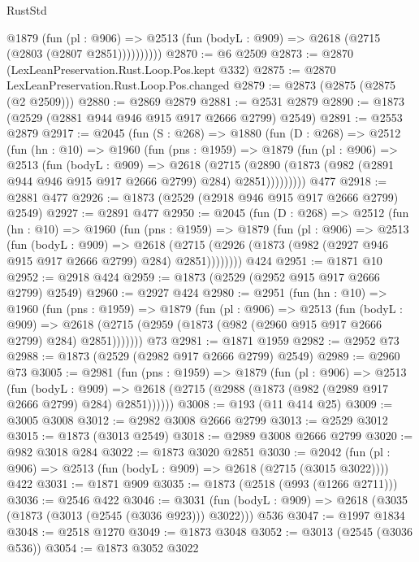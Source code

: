 \begin{lexlean}{RustStd}
\begin{coremodule}
            @1879
              (fun (pl : @906) =>
              @2513 (fun (bodyL : @909) => @2618 (@2715 (@2803 (@2807 @2851))))))))))
@2870 := @6 @2509
@2873 := @2870 (LexLeanPreservation.Rust.Loop.Pos.kept @332)
@2875 := @2870 LexLeanPreservation.Rust.Loop.Pos.changed
@2879 := @2873 (@2875 (@2875 (@2 @2509)))
@2880 := @2869 @2879
@2881 := @2531 @2879
@2890 := @1873 (@2529 (@2881 @944 @946 @915 @917 @2666 @2799) @2549)
@2891 := @2553 @2879
@2917 := @2045
    (fun (S : @268) =>
    @1880
      (fun (D : @268) =>
      @2512
        (fun (hn : @10) =>
        @1960
          (fun (pns : @1959) =>
          @1879
            (fun (pl : @906) =>
            @2513
              (fun (bodyL : @909) =>
              @2618
                (@2715
                  (@2890 (@1873 (@982 (@2891 @944 @946 @915 @917 @2666 @2799) @284) @2851)))))))))
    @477
@2918 := @2881 @477
@2926 := @1873 (@2529 (@2918 @946 @915 @917 @2666 @2799) @2549)
@2927 := @2891 @477
@2950 := @2045
    (fun (D : @268) =>
    @2512
      (fun (hn : @10) =>
      @1960
        (fun (pns : @1959) =>
        @1879
          (fun (pl : @906) =>
          @2513
            (fun (bodyL : @909) =>
            @2618 (@2715 (@2926 (@1873 (@982 (@2927 @946 @915 @917 @2666 @2799) @284) @2851))))))))
    @424
@2951 := @1871 @10
@2952 := @2918 @424
@2959 := @1873 (@2529 (@2952 @915 @917 @2666 @2799) @2549)
@2960 := @2927 @424
@2980 := @2951
    (fun (hn : @10) =>
    @1960
      (fun (pns : @1959) =>
      @1879
        (fun (pl : @906) =>
        @2513
          (fun (bodyL : @909) =>
          @2618 (@2715 (@2959 (@1873 (@982 (@2960 @915 @917 @2666 @2799) @284) @2851)))))))
    @73
@2981 := @1871 @1959
@2982 := @2952 @73
@2988 := @1873 (@2529 (@2982 @917 @2666 @2799) @2549)
@2989 := @2960 @73
@3005 := @2981
    (fun (pns : @1959) =>
    @1879
      (fun (pl : @906) =>
      @2513
        (fun (bodyL : @909) =>
        @2618 (@2715 (@2988 (@1873 (@982 (@2989 @917 @2666 @2799) @284) @2851))))))
@3008 := @193 (@11 @414 @25)
@3009 := @3005 @3008
@3012 := @2982 @3008 @2666 @2799
@3013 := @2529 @3012
@3015 := @1873 (@3013 @2549)
@3018 := @2989 @3008 @2666 @2799
@3020 := @982 @3018 @284
@3022 := @1873 @3020 @2851
@3030 := @2042 (fun (pl : @906) => @2513 (fun (bodyL : @909) => @2618 (@2715 (@3015 @3022)))) @422
@3031 := @1871 @909
@3035 := @1873 (@2518 (@993 (@1266 @2711)))
@3036 := @2546 @422
@3046 := @3031 (fun (bodyL : @909) => @2618 (@3035 (@1873 (@3013 (@2545 (@3036 @923))) @3022))) @536
@3047 := @1997 @1834
@3048 := @2518 @1270
@3049 := @1873 @3048
@3052 := @3013 (@2545 (@3036 @536))
@3054 := @1873 @3052 @3022

\end{coremodule}
\end{lexlean}
